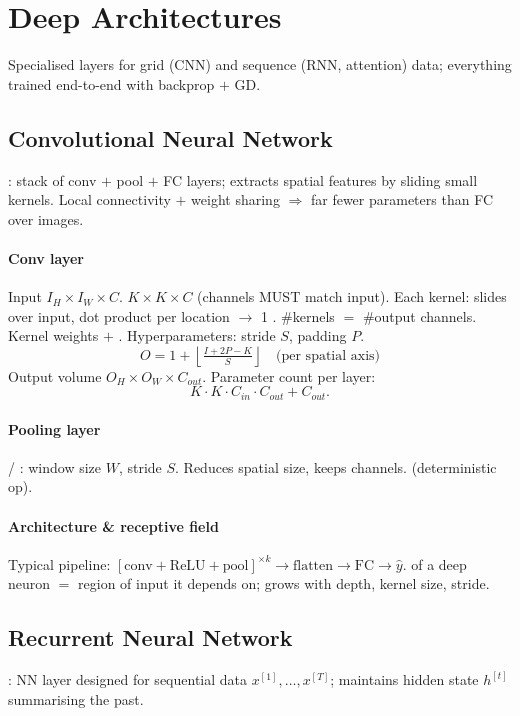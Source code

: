 \section{Deep Architectures}
Specialised layers for grid (CNN) and sequence (RNN, attention) data; everything trained end-to-end with backprop $+$ GD.

\subsection{Convolutional Neural Network}
: stack of conv $+$ pool $+$ FC layers; extracts spatial features by sliding small kernels. Local connectivity $+$ weight sharing $\Rightarrow$ far fewer parameters than FC over images.
\paragraph{Conv layer} Input $I_H\!\times\!I_W\!\times\!C$.  $K\!\times\!K\!\times\!C$ (channels MUST match input). Each kernel: slides over input, dot product per location $\to$ 1 . \#kernels $=$ \#output channels. Kernel weights $+$ . Hyperparameters: stride $S$, padding $P$.
\[O = 1 + \left\lfloor \tfrac{I+2P-K}{S} \right\rfloor\quad\text{(per spatial axis)}\]
Output volume $O_H\!\times\!O_W\!\times\!C_{out}$. Parameter count per layer:
\[K\cdot K\cdot C_{in}\cdot C_{out}+C_{out}.\]
\paragraph{Pooling layer}  / : window size $W$, stride $S$. Reduces spatial size, keeps channels.  (deterministic op).
\paragraph{Architecture \& receptive field} Typical pipeline: $[\text{conv}+\text{ReLU}+\text{pool}]^{\times k}\to\text{flatten}\to\text{FC}\to\hat y$.  of a deep neuron $=$ region of input it depends on; grows with depth, kernel size, stride.

\subsection{Recurrent Neural Network}
: NN layer designed for sequential data $x^{[1]},\ldots,x^{[T]}$; maintains hidden state $h^{[t]}$ summarising the past. 
